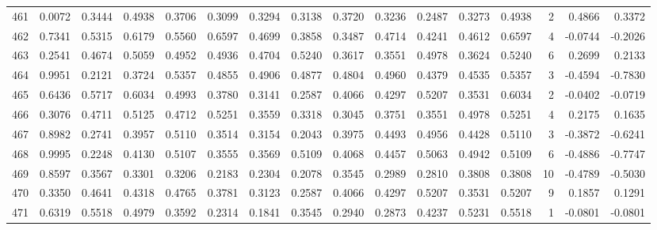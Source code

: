 \begin{tabular}{lrrrrrrrrrrrrrrr}
461 &      0.0072 &  0.3444 &  0.4938 &  0.3706 &  0.3099 &  0.3294 &  0.3138 &  0.3720 &  0.3236 &  0.2487 &   0.3273 &     0.4938 &      2 &                    0.4866 &                     0.3372 \\
462 &      0.7341 &  0.5315 &  0.6179 &  0.5560 &  0.6597 &  0.4699 &  0.3858 &  0.3487 &  0.4714 &  0.4241 &   0.4612 &     0.6597 &      4 &                   -0.0744 &                    -0.2026 \\
463 &      0.2541 &  0.4674 &  0.5059 &  0.4952 &  0.4936 &  0.4704 &  0.5240 &  0.3617 &  0.3551 &  0.4978 &   0.3624 &     0.5240 &      6 &                    0.2699 &                     0.2133 \\
464 &      0.9951 &  0.2121 &  0.3724 &  0.5357 &  0.4855 &  0.4906 &  0.4877 &  0.4804 &  0.4960 &  0.4379 &   0.4535 &     0.5357 &      3 &                   -0.4594 &                    -0.7830 \\
465 &      0.6436 &  0.5717 &  0.6034 &  0.4993 &  0.3780 &  0.3141 &  0.2587 &  0.4066 &  0.4297 &  0.5207 &   0.3531 &     0.6034 &      2 &                   -0.0402 &                    -0.0719 \\
466 &      0.3076 &  0.4711 &  0.5125 &  0.4712 &  0.5251 &  0.3559 &  0.3318 &  0.3045 &  0.3751 &  0.3551 &   0.4978 &     0.5251 &      4 &                    0.2175 &                     0.1635 \\
467 &      0.8982 &  0.2741 &  0.3957 &  0.5110 &  0.3514 &  0.3154 &  0.2043 &  0.3975 &  0.4493 &  0.4956 &   0.4428 &     0.5110 &      3 &                   -0.3872 &                    -0.6241 \\
468 &      0.9995 &  0.2248 &  0.4130 &  0.5107 &  0.3555 &  0.3569 &  0.5109 &  0.4068 &  0.4457 &  0.5063 &   0.4942 &     0.5109 &      6 &                   -0.4886 &                    -0.7747 \\
469 &      0.8597 &  0.3567 &  0.3301 &  0.3206 &  0.2183 &  0.2304 &  0.2078 &  0.3545 &  0.2989 &  0.2810 &   0.3808 &     0.3808 &     10 &                   -0.4789 &                    -0.5030 \\
470 &      0.3350 &  0.4641 &  0.4318 &  0.4765 &  0.3781 &  0.3123 &  0.2587 &  0.4066 &  0.4297 &  0.5207 &   0.3531 &     0.5207 &      9 &                    0.1857 &                     0.1291 \\
471 &      0.6319 &  0.5518 &  0.4979 &  0.3592 &  0.2314 &  0.1841 &  0.3545 &  0.2940 &  0.2873 &  0.4237 &   0.5231 &     0.5518 &      1 &                   -0.0801 &                    -0.0801 \\

\end{tabular}
